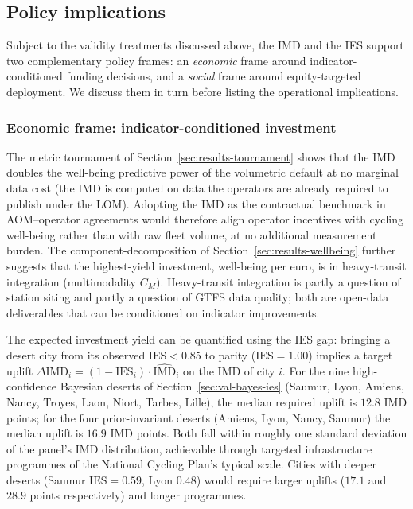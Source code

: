 \documentclass[11pt,a4paper]{article}
\newcommand{\IMD}{\mathrm{IMD}}
\newcommand{\IES}{\mathrm{IES}}
\begin{document}
\subsection{Policy implications}
\label{sec:discussion-policy}

Subject to the validity treatments discussed above, the IMD and
the IES support two complementary policy frames: an
\emph{economic} frame around indicator-conditioned funding
decisions, and a \emph{social} frame around equity-targeted
deployment. We discuss them in turn before listing the
operational implications.

\subsubsection*{Economic frame: indicator-conditioned investment}

The metric tournament of Section~\ref{sec:results-tournament}
shows that the IMD doubles the well-being predictive power of the
volumetric default at no marginal data cost (the IMD is computed
on data the operators are already required to publish under the
LOM). Adopting the IMD as the contractual benchmark in
AOM--operator agreements would therefore align operator
incentives with cycling well-being rather than with raw fleet
volume, at no additional measurement burden. The
component-decomposition of Section~\ref{sec:results-wellbeing}
further suggests that the highest-yield investment, well-being
per euro, is in heavy-transit integration (multimodality
$C_M$). Heavy-transit integration is partly a question of
station siting and partly a question of GTFS data quality;
both are open-data deliverables that can be conditioned on
indicator improvements.

The expected investment yield can be quantified using the IES
gap: bringing a desert city from its observed $\IES < 0.85$ to
parity ($\IES = 1.00$) implies a target uplift
$\Delta\IMD_i = (1 - \IES_i) \cdot \widehat{\IMD}_i$ on the IMD
of city $i$. For the nine high-confidence Bayesian deserts of
Section~\ref{sec:val-bayes-ies} (Saumur, Lyon, Amiens, Nancy,
Troyes, Laon, Niort, Tarbes, Lille), the median required uplift
is $12.8$ IMD points; for the four prior-invariant deserts
(Amiens, Lyon, Nancy, Saumur) the median uplift is $16.9$ IMD
points. Both fall within roughly one standard deviation of the
panel's IMD distribution, achievable through targeted
infrastructure programmes of the National Cycling Plan's typical
scale. Cities with deeper deserts (Saumur $\IES = 0.59$, Lyon
$0.48$) would require larger uplifts ($17.1$ and $28.9$ points
respectively) and longer programmes.
\end{document}
